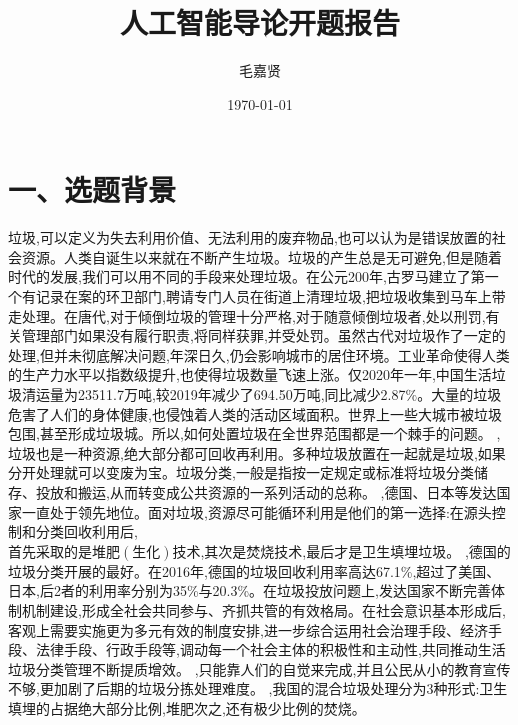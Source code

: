 \documentclass[12pt, a4paper, oneside]{ctexart}
\title{\textbf{人工智能导论开题报告}}
\author{毛嘉贤}
\date{\today}
\begin{document}
\maketitle

\setcounter{page}{1}
\maketitle
\pagestyle{plain}

\newpage
\setcounter{page}{2}
\renewcommand\refname{}
\section*{一、选题背景}
垃圾,可以定义为失去利用价值、无法利用的废弃物品,也可以认为是错误放置的社会资源。人类自诞生以来就在不断产生垃圾。垃圾的产生总是无可避免,但是随着时代的发展,我们可以用不同的手段来处理垃圾。在公元200年,古罗马建立了第一个有记录在案的环卫部门,聘请专门人员在街道上清理垃圾,把垃圾收集到马车上带走处理。在唐代,对于倾倒垃圾的管理十分严格,对于随意倾倒垃圾者,处以刑罚,有关管理部门如果没有履行职责,将同样获罪,并受处罚。虽然古代对垃圾作了一定的处理,但并未彻底解决问题,年深日久,仍会影响城市的居住环境。工业革命使得人类的生产力水平以指数级提升,也使得垃圾数量飞速上涨。仅2020年一年,中国生活垃圾清运量为23511.7万吨,较2019年减少了694.50万吨,同比减少2.87$\%$。大量的垃圾危害了人们的身体健康,也侵蚀着人类的活动区域面积。世界上一些大城市被垃圾包围,甚至形成垃圾城。所以,如何处置垃圾在全世界范围都是一个棘手的问题。
,垃圾也是一种资源,绝大部分都可回收再利用。多种垃圾放置在一起就是垃圾,如果分开处理就可以变废为宝。垃圾分类,一般是指按一定规定或标准将垃圾分类储存、投放和搬运,从而转变成公共资源的一系列活动的总称。
,德国、日本等发达国家一直处于领先地位。面对垃圾,资源尽可能循环利用是他们的第一选择:在源头控制和分类回收利用后,\\首先采取的是堆肥$\left(\text{生化}\right)$技术,其次是焚烧技术,最后才是卫生填埋垃圾。
,德国的垃圾分类开展的最好。在2016年,德国的垃圾回收利用率高达67.1\%,超过了美国、日本,后2者的利用率分别为35\%与20.3\%。在垃圾投放问题上,发达国家不断完善体制机制建设,形成全社会共同参与、齐抓共管的有效格局。在社会意识基本形成后,客观上需要实施更为多元有效的制度安排,进一步综合运用社会治理手段、经济手段、法律手段、行政手段等,调动每一个社会主体的积极性和主动性,共同推动生活垃圾分类管理不断提质增效。
,只能靠人们的自觉来完成,并且公民从小的教育宣传不够,更加剧了后期的垃圾分拣处理难度。
,我国的混合垃圾处理分为3种形式:卫生填埋的占据绝大部分比例,堆肥次之,还有极少比例的焚烧。
\end{document}
